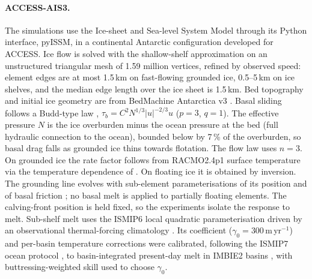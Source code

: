 
\paragraph{ACCESS-AIS3.}
The simulations use the Ice-sheet and Sea-level System Model \citep[ISSM;][]{larour2012} through
its Python interface, pyISSM, in a continental Antarctic configuration developed for ACCESS. Ice
flow is solved with the shallow-shelf approximation \citep{macayeal1989} on an unstructured
triangular mesh of 1.59 million vertices, refined by observed speed: element edges are at most
1.5\,km on fast-flowing grounded ice, 0.5--5\,km on ice shelves, and the median edge length over the
ice sheet is 1.5\,km. Bed topography and initial ice geometry are from BedMachine Antarctica v3
\citep{morlighem2020}. Basal sliding follows a Budd-type law \citep{budd1979},
$\tau_b = C^2 N^{1/3} |u|^{-2/3} u$ ($p = 3$, $q = 1$). The effective pressure $N$ is the ice overburden
minus the ocean pressure at the bed (full hydraulic connection to the ocean), bounded below by
7\,\% of the overburden, so basal drag falls as grounded ice thins towards flotation. The flow law
uses $n = 3$. On grounded ice the rate factor follows from RACMO2.4p1 surface temperature
\citep{vandalum2025} via the temperature dependence of \citet{cuffey2010}. On floating ice it is
obtained by inversion. The grounding line evolves with sub-element parameterisations of its
position and of basal friction \citep{seroussi2014}; no basal melt is applied to partially floating
elements. The calving-front position is held fixed, so the experiments isolate the response to
melt. Sub-shelf melt uses the ISMIP6 local quadratic parameterisation \citep{jourdain2020} driven by
an observational thermal-forcing climatology \citep{zhou2024}. Its coefficient
($\gamma_0 = 300$\,m\,yr$^{-1}$) and per-basin temperature corrections were calibrated, following
the ISMIP7 ocean protocol \citep{reese2026}, to basin-integrated present-day melt \citep{paolo2023,adusumilli2020} in
IMBIE2 basins \citep{mouginot2017}, with buttressing-weighted skill \citep{reese2018} used to choose
$\gamma_0$.

